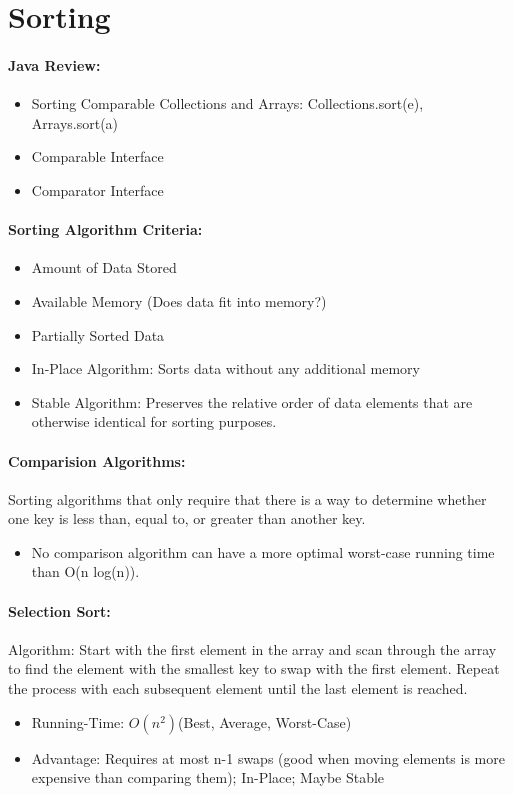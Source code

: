 \documentclass[12pt]{article}
\begin{document}
\section{Sorting}

\paragraph{Java Review:}
\begin{itemize}
	\item Sorting Comparable Collections and Arrays: Collections.sort(e), Arrays.sort(a)
	\item Comparable Interface
	\item Comparator Interface
\end{itemize}

\paragraph{Sorting Algorithm Criteria:}
\begin{itemize}
	\item Amount of Data Stored
	\item Available Memory (Does data fit into memory?)
	\item Partially Sorted Data
	\item In-Place Algorithm: Sorts data without any additional memory
	\item Stable Algorithm: Preserves the relative order of data elements that are otherwise identical for sorting purposes.
\end{itemize}

\paragraph{Comparision Algorithms:} Sorting algorithms that only require that there is a way to determine whether one key is less than, equal to, or greater than another key.
\begin{itemize}
	\item No comparison algorithm can have a more optimal worst-case running time than O(n log(n)).
\end{itemize}

\paragraph{Selection Sort:}
Algorithm: Start with the first element in the array and scan through the array to find the element with the smallest key to swap with the first element. Repeat the process with each subsequent element until the last element is reached.
\begin{itemize}
	\item Running-Time: \(O(n^2) \)(Best, Average, Worst-Case)
	\item Advantage: Requires at most n-1 swaps (good when moving elements is more expensive than comparing them); In-Place; Maybe Stable
\end{itemize}
\end{document}
